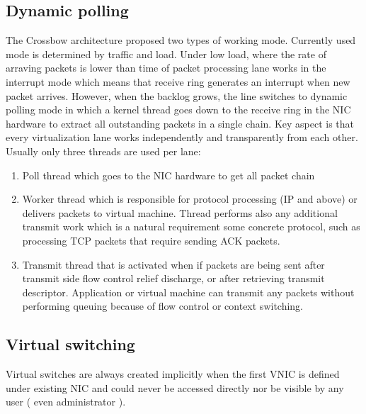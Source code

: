 \documentclass[11pt]{book}
\begin{document}
		\subsection{Dynamic polling}	
			
      The Crossbow architecture proposed two types of working mode. Currently used mode is determined by traffic and
      load. Under low load, where the rate of arraving packets is lower than time of packet processing lane works in the
      interrupt mode which means that receive ring generates an interrupt when new packet arrives. However, when the
      backlog grows, the line switches to dynamic polling mode in which a kernel thread goes down to the receive ring in
      the NIC hardware to extract all outstanding packets in a single chain. Key aspect is that every virtualization
      lane works independently and transparently from each other. Usually only three threads are used per lane:
			
			\begin{enumerate}
				\item Poll thread which goes to the NIC hardware to get all packet chain
				\item Worker thread which is responsible for protocol processing (IP and above) or delivers packets to virtual machine. Thread performs also any additional transmit work which is a natural 
				requirement some concrete protocol, such as processing TCP packets that require sending ACK packets.
				\item Transmit thread that is activated when if packets are being sent after transmit side flow control relief
        discharge, or after retrieving transmit descriptor. Application or virtual 
				machine can transmit any packets without performing queuing because of flow control or context switching.
			\end{enumerate}

    \subsection{Virtual switching}
			
			Virtual switches are always created implicitly when the first VNIC is defined under existing NIC and could never be accessed directly nor be visible by
			any user ( even administrator ). 
			
\end{document}
